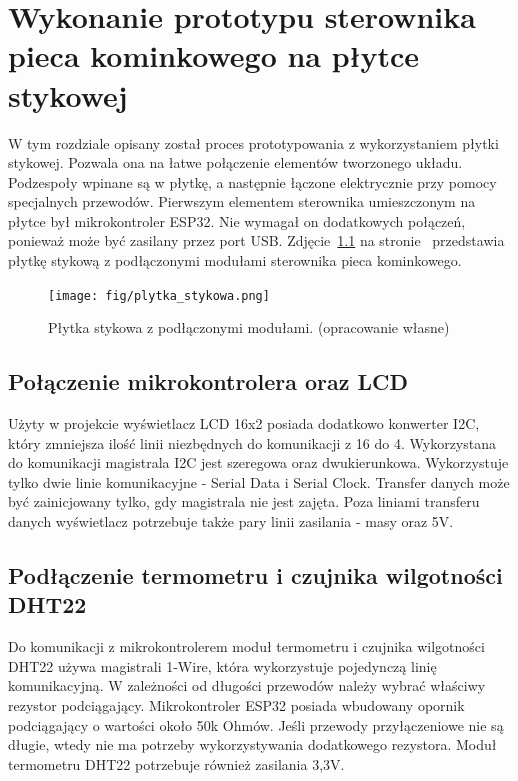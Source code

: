 \documentclass[11pt]{report}
\begin{document}
 \chapter{Wykonanie prototypu sterownika pieca kominkowego na płytce stykowej}\label{ch:prototyp:stykowa}
 W tym rozdziale opisany został proces prototypowania z wykorzystaniem płytki stykowej.
 Pozwala ona na łatwe połączenie elementów tworzonego układu. Podzespoły wpinane są w płytkę, a następnie łączone elektrycznie przy pomocy specjalnych przewodów.
 Pierwszym elementem sterownika umieszczonym na płytce był mikrokontroler ESP32. Nie wymagał on dodatkowych połączeń, ponieważ może być zasilany przez port USB.
    Zdjęcie~\ref{fig:stykowa} na stronie~\pageref{fig:stykowa} przedstawia płytkę stykową z podłączonymi modułami sterownika pieca kominkowego.
    \begin{figure}[ht]
\centering
\texttt{[image: fig/plytka\_stykowa.png]}
\caption{Płytka stykowa z podłączonymi modułami. (opracowanie własne)}
\label{fig:stykowa}
\end{figure}
  
 \section{Połączenie mikrokontrolera oraz LCD}
 Użyty w projekcie wyświetlacz LCD 16x2 posiada dodatkowo konwerter I2C, który zmniejsza ilość linii niezbędnych do komunikacji z 16 do 4. Wykorzystana do komunikacji magistrala I2C jest szeregowa oraz dwukierunkowa. Wykorzystuje tylko dwie linie komunikacyjne - Serial Data i Serial Clock. Transfer danych może być zainicjowany tylko, gdy magistrala nie jest zajęta. Poza liniami transferu danych wyświetlacz potrzebuje także pary linii zasilania - masy oraz 5V.
  
 \section{Podłączenie termometru i czujnika wilgotności DHT22}\label{dht}
 Do komunikacji z mikrokontrolerem moduł termometru i czujnika wilgotności DHT22  używa magistrali 1-Wire, która wykorzystuje pojedynczą linię komunikacyjną. W zależności od długości przewodów należy wybrać właściwy rezystor podciągający.  Mikrokontroler ESP32 posiada wbudowany opornik podciągający o wartości około 50k Ohmów. Jeśli przewody przyłączeniowe nie są długie, wtedy nie ma potrzeby wykorzystywania dodatkowego rezystora.
 Moduł termometru DHT22 potrzebuje również zasilania 3,3V.
 
\end{document}
